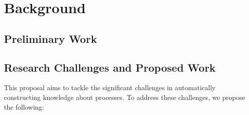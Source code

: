 \section{Background}

\subsection{Preliminary Work}

\subsection{Research Challenges and Proposed Work}

This proposal aims to tackle the significant challenges in automatically constructing knowledge about processes. To address these challenges, we propose the following:

